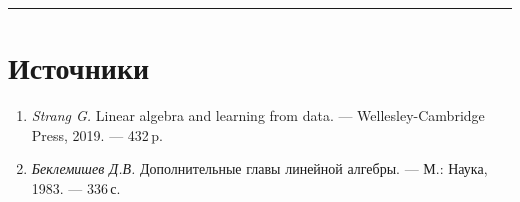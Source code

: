 \documentclass[11pt,a4paper]{article}
\providecommand{\tightlist}{%
      \setlength{\itemsep}{0pt}\setlength{\parskip}{0pt}}
\begin{document}
    \begin{center}\rule{0.5\linewidth}{0.5pt}\end{center}

    \hypertarget{ux438ux441ux442ux43eux447ux43dux438ux43aux438}{%
\section{Источники}\label{ux438ux441ux442ux43eux447ux43dux438ux43aux438}}

\begin{enumerate}
\def\labelenumi{\arabic{enumi}.}
\tightlist
\item
  \emph{Strang G.} Linear algebra and learning from data. ---
  Wellesley-Cambridge Press, 2019. --- 432\,p.
\item
  \emph{Беклемишев Д.В.} Дополнительные главы линейной алгебры. --- М.:
  Наука, 1983. --- 336\,с.
\end{enumerate}



    
    
    
\end{document}

